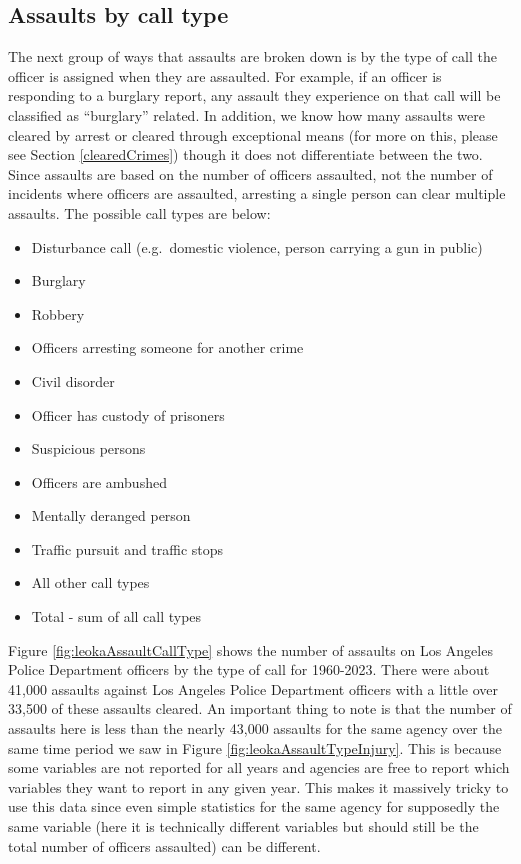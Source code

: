 \documentclass[
]{krantz}
\providecommand{\tightlist}{%
  \setlength{\itemsep}{0pt}\setlength{\parskip}{0pt}}
\begin{document}
\subsection{Assaults by call
type}\label{assaults-by-call-type}

The next group of ways that assaults are broken down is by
the type of call the officer is assigned when they are
assaulted. For example, if an officer is responding to a
burglary report, any assault they experience on that call
will be classified as ``burglary'' related. In addition, we
know how many assaults were cleared by arrest or cleared
through exceptional means (for more on this, please see
Section \ref{clearedCrimes}) though it does not
differentiate between the two. Since assaults are based on
the number of officers assaulted, not the number of
incidents where officers are assaulted, arresting a single
person can clear multiple assaults. The possible call types
are below:

\begin{itemize}
\tightlist
\item
  Disturbance call (e.g.~domestic violence, person carrying
  a gun in public)
\item
  Burglary
\item
  Robbery
\item
  Officers arresting someone for another crime
\item
  Civil disorder
\item
  Officer has custody of prisoners
\item
  Suspicious persons
\item
  Officers are ambushed
\item
  Mentally deranged person
\item
  Traffic pursuit and traffic stops
\item
  All other call types
\item
  Total - sum of all call types
\end{itemize}

Figure \ref{fig:leokaAssaultCallType} shows the number of
assaults on Los Angeles Police Department officers by the
type of call for 1960-2023. There were about 41,000 assaults
against Los Angeles Police Department officers with a little
over 33,500 of these assaults cleared. An important thing to
note is that the number of assaults here is less than the
nearly 43,000 assaults for the same agency over the same
time period we saw in Figure
\ref{fig:leokaAssaultTypeInjury}. This is because some
variables are not reported for all years and agencies are
free to report which variables they want to report in any
given year. This makes it massively tricky to use this data
since even simple statistics for the same agency for
supposedly the same variable (here it is technically
different variables but should still be the total number of
officers assaulted) can be different.
\end{document}
